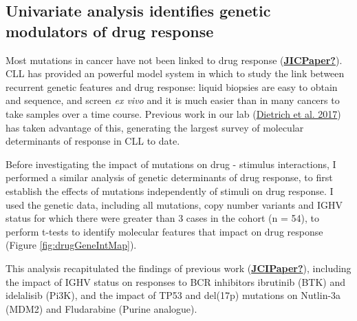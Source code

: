 \documentclass[11pt, a4paper, twosided]{book}
\begin{document}
\hypertarget{univariate-gene-drug-associations}{%
\subsection{Univariate analysis identifies genetic modulators of drug response}\label{univariate-gene-drug-associations}}

Most mutations in cancer have not been linked to drug response (\protect\hyperlink{ref-JICPaper}{\textbf{JICPaper?}}). CLL has provided an powerful model system in which to study the link between recurrent genetic features and drug response: liquid biopsies are easy to obtain and sequence, and screen \emph{ex vivo} and it is much easier than in many cancers to take samples over a time course. Previous work in our lab (\protect\hyperlink{ref-JCIpaper}{Dietrich et al. 2017}) has taken advantage of this, generating the largest survey of molecular determinants of response in CLL to date.

Before investigating the impact of mutations on drug - stimulus interactions, I performed a similar analysis of genetic determinants of drug response, to first establish the effects of mutations independently of stimuli on drug response. I used the genetic data, including all mutations, copy number variants and IGHV status for which there were greater than 3 cases in the cohort (n = 54), to perform t-tests to identify molecular features that impact on drug response (Figure \ref{fig:drugGeneIntMap}).

This analysis recapitulated the findings of previous work (\protect\hyperlink{ref-JCIPaper}{\textbf{JCIPaper?}}), including the impact of IGHV status on responses to BCR inhibitors ibrutinib (BTK) and idelalisib (Pi3K), and the impact of TP53 and del(17p) mutations on Nutlin-3a (MDM2) and Fludarabine (Purine analogue).
\end{document}
